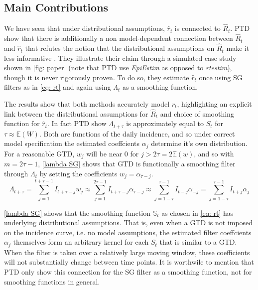 \documentclass[12pt]{article}
\begin{document}
    \subsection{Main Contributions}
      We have seen that under distributional assumptions, $\hat{r}_t$ is connected to $\hat{R}_t$. 
      PTD show that there is additionally a non model-dependent connection between 
      $\hat{R}_t$ and $\hat{r}_t$ that refutes the notion that
      the distributional assumptions on $\hat{R}_t$ make it less informative \citep{Pellis2022, DushoffPark2021}.
      They illustrate their claim through a simulated case study shown in \cref{fig: paper} (note that PTD use \textit{EpiEstim} \citep{Nash2023} 
      as opposed to \textit{rtestim}), though it is never rigorously proven. To do so, they estimate $\hat{r}_t$ once
      using SG filters as in \cref{eq: rt} and again using $\Lambda_t$ as a smoothing function.

      The results show that both methods accurately model $r_t$, highlighting an explicit link between
      the distributional assumptions for $\hat{R}_t$ and choice of smoothing function for $\hat{r}_t$. In fact PTD show $\Lambda_{t+\tau}$ is approximately equal to $S_t$ 
      for $\tau \approx \mathbb{E}(W)$. Both are functions of the daily incidence, and so under correct model specification the
      estimated coeffcients $\alpha_j$ determine it's own distribution. For a reasonable GTD, $w_j$ will be near 0 for $j > 2\tau = 2\mathbb{E}(w)$,
      and so with $m = 2\tau - 1$, \cref{lambda SG} shows that GTD is functionally a smoothing filter through $\Lambda_t$ by setting the 
      coefficients $w_j = \alpha_{\tau - j}$.
      \begin{equation} \label{lambda SG}
        \Lambda_{t+\tau} = \sum_{j = 1}^{t + \tau - 1} I_{t + \tau - j}w_j  
        \approx \sum_{j = 1}^{2\tau - 1} I_{t + \tau - j}\alpha_{\tau -j}
        \approx \sum_{j = 1 - \tau}^{\tau - 1} I_{t - j} \alpha_{-j}
        = \sum_{j = 1 - \tau}^{\tau - 1} I_{t + j} \alpha_{j}
      \end{equation}
      
      \cref{lambda SG} shows that the smoothing function $\mathbb{S}_t$
      as chosen in \cref{eq: rt} has underlying distributional assumptions. That is, even when a GTD is not imposed on the incidence curve,  
      i.e. no model assumptions, 
      the estimated filter coeffcients $\alpha_j$ themselves form an arbitrary kernel for each $S_t$ that is similar to a GTD. 
      When the filter is taken over a relatively large moving window, these coefficients will not substantially change between time points. 
      It is worthwile to mention that PTD only show this connection for the SG filter as a smoothing function, not for smoothing
      functions in general. 
      
\end{document}
